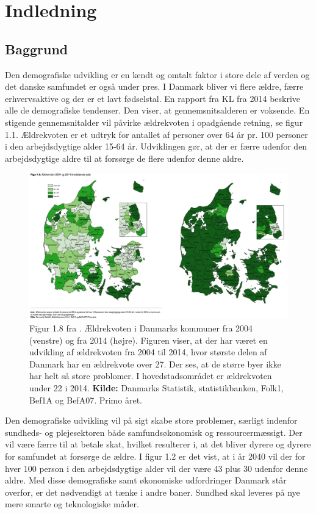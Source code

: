 \chapter{Indledning}

\section{Baggrund}
Den demografiske udvikling er en kendt og omtalt faktor i store dele af verden og  det danske samfundet er også under pres. I Danmark bliver vi flere ældre, færre erhvervsaktive og der er et lavt fødselstal. En rapport fra KL fra 2014 beskrive alle de demografiske tendenser. Den viser, at gennemsnitsalderen er voksende. En stigende gennemsnitalder vil påvirke ældrekvoten i opadgående retning, se figur 1.1. Ældrekvoten er et udtryk for antallet af personer over 64 år pr. 100 personer i den arbejdsdygtige alder 15-64 år. \cite{KL} Udviklingen gør, at der er færre udenfor den arbejdsdygtige aldre til at forsørge de flere udenfor denne aldre. 

\begin{figure}[H]
\centering
\caption{Figur 1.8 fra \cite{KL}. Ældrekvoten i Danmarks kommuner fra 2004 (venstre) og fra 2014 (højre). Figuren viser, at der har været en udvikling af ældrekvoten fra 2004 til 2014, hvor største delen af Danmark har en ældrekvote over 27. Der ses, at de større byer ikke har helt så store problomer. I hovedstadsområdet er ældrekvoten under 22 i 2014. \textbf{Kilde:} Danmarks Statistik, statistikbanken, Folk1, Bef1A og BefA07. Primo året.}
\includegraphics[width=1\textwidth]{Figurer/Snip20160428_14}
\end{figure}

Den demografiske udvikling vil på sigt skabe store problemer, særligt indenfor sundheds- og plejesektoren både samfundsøkonomisk og ressourcermæssigt. Der vil være færre til at betale skat, hvilket resulterer i, at det bliver dyrere og dyrere for samfundet at forsørge de ældre. I figur 1.2 er det vist, at i år 2040 vil der for hver 100 person i den arbejdsdygtige alder vil der være 43 plus 30 udenfor denne aldre. Med disse demografiske samt økonomiske udfordringer Danmark står overfor, er det nødvendigt at tænke i andre baner. Sundhed skal leveres på nye mere smarte og teknologiske måder.

